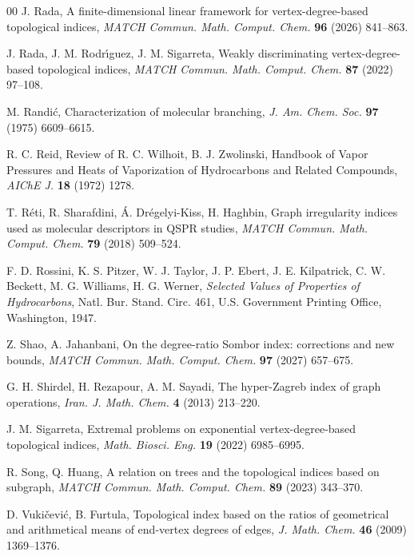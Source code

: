 \documentclass[a5paper, 10pt]{article}
\theoremstyle{plain}
\theoremstyle{remark}
\theoremstyle{definition}
\begin{document}
\begin{thebibliography}{00}
   J. Rada, A finite-dimensional linear
  framework for vertex-degree-based topological indices, \textit{MATCH
  Commun. Math. Comput. Chem.\/} \textbf{96} (2026) 841--863.

   J. Rada, J. M. Rodr\'{\i}guez,
  J. M. Sigarreta, Weakly discriminating vertex-degree-based topological
  indices, \textit{MATCH Commun. Math. Comput. Chem.\/} \textbf{87} (2022)
  97--108.

   M. Randi\'c, Characterization of molecular
  branching, \textit{J. Am. Chem. Soc.\/} \textbf{97} (1975) 6609--6615.

   R. C. Reid, Review of R. C. Wilhoit, B. J. Zwolinski, Handbook
  of Vapor Pressures and Heats of Vaporization of Hydrocarbons and Related
  Compounds, \textit{AIChE J.\/} \textbf{18} (1972) 1278.

   T. R\'eti, R. Sharafdini,
  \'A. Dr\'egelyi-Kiss, H. Haghbin, Graph irregularity indices used as
  molecular descriptors in QSPR studies, \textit{MATCH Commun. Math.
  Comput. Chem.\/} \textbf{79} (2018) 509--524.

   F. D. Rossini, K. S. Pitzer, W. J. Taylor,
  J. P. Ebert, J. E. Kilpatrick, C. W. Beckett, M. G. Williams, H. G. Werner,
  \textit{Selected Values of Properties of Hydrocarbons\/}, Natl. Bur.
  Stand. Circ. 461, U.S. Government Printing Office, Washington, 1947.

   Z. Shao, A. Jahanbani, On the degree-ratio Sombor
  index: corrections and new bounds, \textit{MATCH Commun. Math. Comput.
  Chem.\/} \textbf{97} (2027) 657--675.

   G. H. Shirdel, H. Rezapour,
  A. M. Sayadi, The hyper-Zagreb index of graph operations,
  \textit{Iran. J. Math. Chem.\/} \textbf{4} (2013) 213--220.

   J. M. Sigarreta, Extremal problems on
  exponential vertex-degree-based topological indices, \textit{Math.
  Biosci. Eng.\/} \textbf{19} (2022) 6985--6995.

   R. Song, Q. Huang, A relation on trees and the
  topological indices based on subgraph, \textit{MATCH Commun. Math.
  Comput. Chem.\/} \textbf{89} (2023) 343--370.

   D. Vuki\v{c}evi\'c, B. Furtula, Topological
  index based on the ratios of geometrical and arithmetical means of
  end-vertex degrees of edges, \textit{J. Math. Chem.\/} \textbf{46} (2009)
  1369--1376.


\end{thebibliography}
\end{document}
